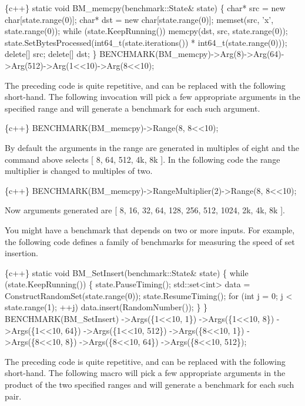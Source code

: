 \begin{DoxyCode}
\{c++\}
static void BM\_memcpy(benchmark::State& state) \{
  char* src = new char[state.range(0)];
  char* dst = new char[state.range(0)];
  memset(src, 'x', state.range(0));
  while (state.KeepRunning())
    memcpy(dst, src, state.range(0));
  state.SetBytesProcessed(int64\_t(state.iterations()) *
                          int64\_t(state.range(0)));
  delete[] src;
  delete[] dst;
\}
BENCHMARK(BM\_memcpy)->Arg(8)->Arg(64)->Arg(512)->Arg(1<<10)->Arg(8<<10);
\end{DoxyCode}


The preceding code is quite repetitive, and can be replaced with the following short-\/hand. The following invocation will pick a few appropriate arguments in the specified range and will generate a benchmark for each such argument.


\begin{DoxyCode}
\{c++\}
BENCHMARK(BM\_memcpy)->Range(8, 8<<10);
\end{DoxyCode}


By default the arguments in the range are generated in multiples of eight and the command above selects \mbox{[} 8, 64, 512, 4k, 8k \mbox{]}. In the following code the range multiplier is changed to multiples of two.


\begin{DoxyCode}
\{c++\}
BENCHMARK(BM\_memcpy)->RangeMultiplier(2)->Range(8, 8<<10);
\end{DoxyCode}
 Now arguments generated are \mbox{[} 8, 16, 32, 64, 128, 256, 512, 1024, 2k, 4k, 8k \mbox{]}.

You might have a benchmark that depends on two or more inputs. For example, the following code defines a family of benchmarks for measuring the speed of set insertion.


\begin{DoxyCode}
\{c++\}
static void BM\_SetInsert(benchmark::State& state) \{
  while (state.KeepRunning()) \{
    state.PauseTiming();
    std::set<int> data = ConstructRandomSet(state.range(0));
    state.ResumeTiming();
    for (int j = 0; j < state.range(1); ++j)
      data.insert(RandomNumber());
  \}
\}
BENCHMARK(BM\_SetInsert)
    ->Args(\{1<<10, 1\})
    ->Args(\{1<<10, 8\})
    ->Args(\{1<<10, 64\})
    ->Args(\{1<<10, 512\})
    ->Args(\{8<<10, 1\})
    ->Args(\{8<<10, 8\})
    ->Args(\{8<<10, 64\})
    ->Args(\{8<<10, 512\});
\end{DoxyCode}


The preceding code is quite repetitive, and can be replaced with the following short-\/hand. The following macro will pick a few appropriate arguments in the product of the two specified ranges and will generate a benchmark for each such pair.


